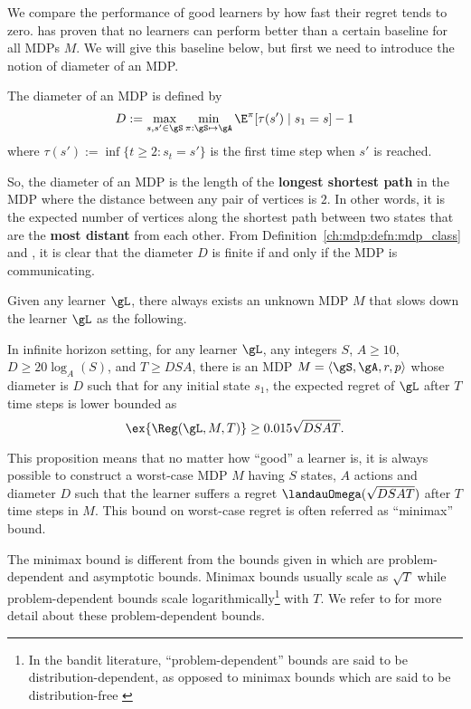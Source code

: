 We compare the performance of good learners by how fast their regret tends to zero.
\cite{jaksch2010near} has proven that no learners can perform better than a certain baseline for all MDPs $M$.
We will give this baseline below, but first we need to introduce the notion of diameter of an MDP.
\begin{defn}
    The diameter of an MDP is defined by
    \begin{equation}
        \label{eq:diameter}
        D := \max_{s,s'\in\gS}\min_{\pi:\gS\mapsto\gA} \E^\pi[\tau(s') \mid s_1=s] -1
    \end{equation}
    where $\tau(s'):=\inf\{t\ge2 : s_t=s'\}$ is the first time step when $s'$ is reached.
    \label{ch:rl:defn:diameter}
\end{defn}
So, the diameter of an MDP is the length of the \textbf{longest shortest path} in the MDP where the distance between any pair of vertices is $2$.
In other words, it is the expected number of vertices along the shortest path between two states that are the \textbf{most distant} from each other.
From Definition~\ref{ch:mdp:defn:mdp_class} and \cite[Proposition~8.3.1]{puterman2014markov}, it is clear that the diameter $D$ is finite if and only if the MDP is communicating.

Given any learner $\gL$, there always exists an unknown MDP $M$ that slows down the learner $\gL$ as the following.
\begin{prop}
    \label{prop:minimax_rg_lb}
    In infinite horizon setting, for any learner $\gL$, any integers $S$, $A\ge10$, $D\ge 20\log_{A}(S)$, and $T\ge DSA$, there is an MDP $M=\langle\gS,\gA,r,p\rangle$ whose diameter is $D$ such that for any initial state $s_1$, the expected regret of $\gL$ after $T$ time steps is lower bounded as
    \begin{equation}
        \label{eq:minimax_rg_lb}
        \ex{\Reg(\gL, M, T)} \ge 0.015\sqrt{DSAT}.
    \end{equation}
\end{prop}
This proposition means that no matter how ``good'' a learner is, it is always possible to construct a worst-case MDP $M$ having $S$ states, $A$ actions and diameter $D$ such that the learner suffers a regret $\landauOmega(\sqrt{DSAT})$ after $T$ time steps in $M$.
This bound on worst-case regret is often referred as ``minimax'' bound.

The minimax bound is different from the bounds given in \cite{ok2018exploration, burnetas1997optimal} which are problem-dependent and asymptotic bounds.
Minimax bounds usually scale as $\sqrt{T}$ while problem-dependent bounds scale logarithmically\footnote{In the bandit literature, “problem-dependent” bounds are said to be distribution-dependent, as opposed to minimax bounds which are said to be distribution-free \cite{garivier2019explore}} with $T$.
We refer to \cite{ok2018exploration, burnetas1997optimal} for more detail about these problem-dependent bounds.

